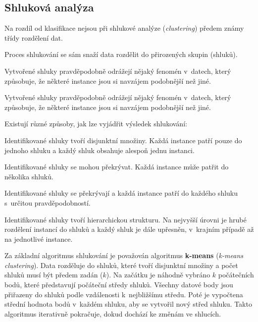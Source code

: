 \subsection{Shluková analýza}

\begin{compactitem}
    \item Na rozdíl od klasifikace nejsou při shlukové analýze (\textit{clustering}) předem známy třídy rozdělení dat.

    \item Proces shlukování se sám snaží data rozdělit do přirozených skupin (shluků).

    \item Vytvořené shluky pravděpodobně odrážejí nějaký fenomén v~datech, který způsobuje, že některé instance jsou si navzájem podobnější než jiné.

    \item Vytvořené shluky pravděpodobně odrážejí nějaký fenomén v~datech, který způsobuje, že některé instance jsou si navzájem podobnější než jiné.

    \item Existují různé způsoby, jak lze vyjádřit výsledek shlukování:

    \begin{compactitem}
        \item Identifikované shluky tvoří disjunktní množiny. Každá instance patří pouze do jednoho shluku a každý shluk obsahuje alespoň jednu instanci.

        \item Identifikované shluky se mohou překrývat. Každá instance může patřit do několika shluků.

        \item Identifikované shluky se překrývají a každá instance patří do každého shluku s~určitou pravděpodobností.

        \item Identifikované shluky tvoří hierarchickou strukturu. Na nejvyšší úrovni je hrubé rozdělení instancí do shluků a každý shluk je dále upřesněn, v~krajním případě až na jednotlivé instance.
    \end{compactitem}

    \item Za základní algoritmus shlukování je považován algoritmus \textbf{k-means} (\textit{k-means clustering}). Data rozděluje do shluků, které tvoří disjunktní množiny a počet shluků musí být předem zadán ($k$). Na začátku je náhodně vybráno $k$ počátečních bodů, které představují počáteční středy shluků. Všechny datové body jsou přiřazeny do shluků podle vzdálenosti k~nejbližšímu středu. Poté je vypočtena střední hodnota bodů v~každém shluku, aby se vytvořil nový střed shluku. Takto algoritmus iterativně pokračuje, dokud dochází ke změnám ve shlucích.
\end{compactitem}

